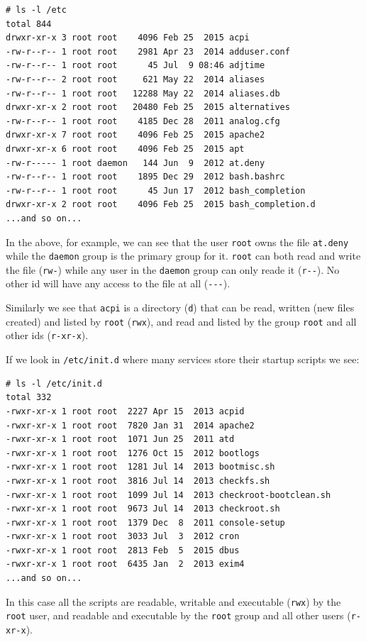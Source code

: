 \documentclass[10pt,]{book}
\numberwithin{figure}{chapter}
\begin{document}
\begin{verbatim}
# ls -l /etc
total 844
drwxr-xr-x 3 root root    4096 Feb 25  2015 acpi
-rw-r--r-- 1 root root    2981 Apr 23  2014 adduser.conf
-rw-r--r-- 1 root root      45 Jul  9 08:46 adjtime
-rw-r--r-- 2 root root     621 May 22  2014 aliases
-rw-r--r-- 1 root root   12288 May 22  2014 aliases.db
drwxr-xr-x 2 root root   20480 Feb 25  2015 alternatives
-rw-r--r-- 1 root root    4185 Dec 28  2011 analog.cfg
drwxr-xr-x 7 root root    4096 Feb 25  2015 apache2
drwxr-xr-x 6 root root    4096 Feb 25  2015 apt
-rw-r----- 1 root daemon   144 Jun  9  2012 at.deny
-rw-r--r-- 1 root root    1895 Dec 29  2012 bash.bashrc
-rw-r--r-- 1 root root      45 Jun 17  2012 bash_completion
drwxr-xr-x 2 root root    4096 Feb 25  2015 bash_completion.d
...and so on...
\end{verbatim}

In the above, for example, we can see that the user \texttt{root} owns
the file \texttt{at.deny} while the \texttt{daemon} group is the primary
group for it. \texttt{root} can both read and write the file
(\texttt{rw-}) while any user in the \texttt{daemon} group can only
reade it (\texttt{r-{}-}). No other id will have any access to the file
at all (\texttt{-{}-{}-}).

Similarly we see that \texttt{acpi} is a directory (\texttt{d}) that can
be read, written (new files created) and listed by \texttt{root}
(\texttt{rwx}), and read and listed by the group \texttt{root} and all
other ids (\texttt{r-xr-x}).

If we look in \texttt{/etc/init.d} where many services store their
startup scripts we see:

\begin{verbatim}
# ls -l /etc/init.d
total 332
-rwxr-xr-x 1 root root  2227 Apr 15  2013 acpid
-rwxr-xr-x 1 root root  7820 Jan 31  2014 apache2
-rwxr-xr-x 1 root root  1071 Jun 25  2011 atd
-rwxr-xr-x 1 root root  1276 Oct 15  2012 bootlogs
-rwxr-xr-x 1 root root  1281 Jul 14  2013 bootmisc.sh
-rwxr-xr-x 1 root root  3816 Jul 14  2013 checkfs.sh
-rwxr-xr-x 1 root root  1099 Jul 14  2013 checkroot-bootclean.sh
-rwxr-xr-x 1 root root  9673 Jul 14  2013 checkroot.sh
-rwxr-xr-x 1 root root  1379 Dec  8  2011 console-setup
-rwxr-xr-x 1 root root  3033 Jul  3  2012 cron
-rwxr-xr-x 1 root root  2813 Feb  5  2015 dbus
-rwxr-xr-x 1 root root  6435 Jan  2  2013 exim4
...and so on...
\end{verbatim}

In this case all the scripts are readable, writable and executable
(\texttt{rwx}) by the \texttt{root} user, and readable and executable by
the \texttt{root} group and all other users (\texttt{r-xr-x}).
\end{document}
